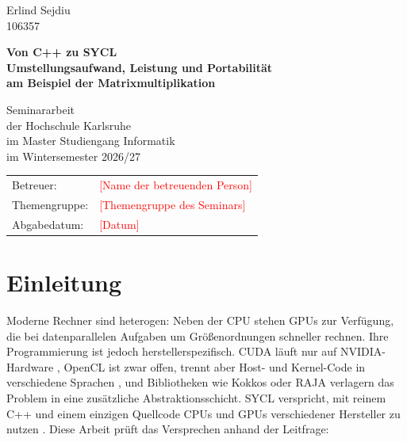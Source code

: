 \documentclass[12pt,a4paper]{article}
\newcommand{\offen}[1]{\textcolor{red}{[#1]}}
\begin{document}

\begin{titlepage}
    \raggedright
    Erlind Sejdiu\\
    106357
    \vspace*{3cm}

    \begin{center}
        {\LARGE\bfseries Von C++ zu SYCL\\[0.3em]
        Umstellungsaufwand, Leistung und Portabilität\\[0.3em]
        am Beispiel der Matrixmultiplikation\par}
        \vspace{2cm}
        {\large Seminararbeit\\
        der Hochschule Karlsruhe\\
        im Master Studiengang Informatik\\
        im Wintersemester 2026/27\par}
    \end{center}
    \vfill
    \begin{tabular}{@{}ll}
        Betreuer: & \offen{Name der betreuenden Person}\\
        Themengruppe: & \offen{Themengruppe des Seminars}\\
        Abgabedatum: & \offen{Datum}
    \end{tabular}
\end{titlepage}

\setcounter{page}{1}
\tableofcontents
\newpage
\listoffigures
\listoftables
\newpage


\section{Einleitung}

Moderne Rechner sind heterogen: Neben der CPU stehen GPUs zur Verfügung, die
bei datenparallelen Aufgaben um Größenordnungen schneller rechnen. Ihre
Programmierung ist jedoch herstellerspezifisch. CUDA läuft nur auf
NVIDIA-Hardware \cite{nickolls2008cuda}, OpenCL ist zwar offen, trennt aber
Host- und Kernel-Code in verschiedene Sprachen \cite{stone2010opencl}, und
Bibliotheken wie Kokkos \cite{edwards2014kokkos} oder RAJA
\cite{beckingsale2019raja} verlagern das Problem in eine zusätzliche
Abstraktionsschicht. SYCL verspricht, mit reinem C++ und einem einzigen
Quellcode CPUs und GPUs verschiedener Hersteller zu nutzen
\cite{khronos2020sycl}. Diese Arbeit prüft das Versprechen anhand der
Leitfrage:
\end{document}
